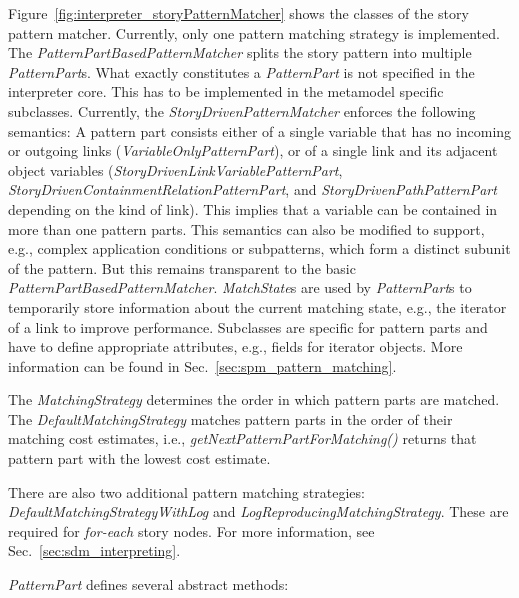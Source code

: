 Figure~\ref{fig:interpreter_storyPatternMatcher} shows the classes of the story pattern matcher. 
Currently, only one pattern matching strategy is implemented. 
The \emph{PatternPartBasedPatternMatcher} splits the story pattern into multiple \emph{PatternPart}s. 
What exactly constitutes a \emph{PatternPart} is not specified in the interpreter core. 
This has to be implemented in the metamodel specific subclasses. 
Currently, the \emph{StoryDrivenPatternMatcher} enforces the following semantics: A pattern part consists either of a single variable that has no incoming or outgoing links (\emph{VariableOnlyPatternPart}), or of a single link and its adjacent object variables (\emph{StoryDrivenLinkVariablePatternPart}, \emph{StoryDrivenContainmentRelationPatternPart}, and \emph{StoryDrivenPathPatternPart} depending on the kind of link). 
This implies that a variable can be contained in more than one pattern parts. 
This semantics can also be modified to support, e.g., complex application conditions or subpatterns, which form a distinct subunit of the pattern.
But this remains transparent to the basic \emph{PatternPartBasedPatternMatcher}.
\emph{MatchState}s are used by \emph{PatternPart}s to temporarily store information about the current matching state, e.g., the iterator of a link to improve performance.
Subclasses are specific for pattern parts and have to define appropriate attributes, e.g., fields for iterator objects.
More information can be found in Sec.~\ref{sec:spm_pattern_matching}.

The \emph{MatchingStrategy} determines the order in which pattern parts are matched. 
The \emph{DefaultMatchingStrategy} matches pattern parts in the order of their matching cost estimates, i.e., \emph{getNextPatternPartForMatching()} returns that pattern part with the lowest cost estimate. 

There are also two additional pattern matching strategies: \emph{DefaultMatchingStrategyWithLog} and \emph{LogReproducingMatchingStrategy}. 
These are required for \emph{for-each} story nodes. For more information, see Sec.~\ref{sec:sdm_interpreting}.

\emph{PatternPart} defines several abstract methods:

